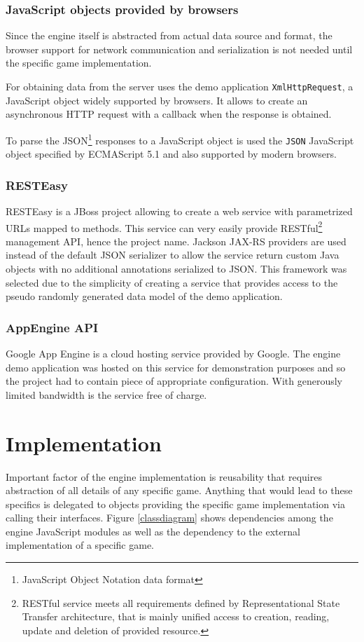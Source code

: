 \documentclass[11pt,oneside, final]{fithesis2}
\begin{document}
\subsection{JavaScript objects provided by browsers}
Since the engine itself is abstracted from actual data source and format, the browser support for network communication and serialization is not needed until the specific game implementation.

For obtaining data from the server uses the demo application \texttt{XmlHttpRequest}, a JavaScript object widely supported by browsers\cite{xhr}. It allows to create an asynchronous HTTP request with a callback when the response is obtained.

To parse the JSON\footnote{JavaScript Object Notation data format} responses to a JavaScript object is used the \texttt{JSON} JavaScript object specified by ECMAScript 5.1 and also supported by modern browsers\cite{json}.

\subsection{RESTEasy}
RESTEasy is a JBoss project allowing to create a web service with parametrized URLs mapped to methods\cite{resteasy}. This service can very easily  provide RESTful\footnote{RESTful service meets all requirements defined by Representational State Transfer architecture, that is mainly unified access to creation, reading, update and deletion of provided resource\cite{fielding}.} management API, hence the project name. Jackson JAX-RS providers\cite{jackson} are used instead of the default JSON serializer to allow the service return custom Java objects with no additional annotations serialized to JSON. This framework was selected due to the simplicity of creating a service that provides access to the pseudo randomly generated data model of the demo application.

\subsection{AppEngine API}
Google App Engine is a cloud hosting service provided by Google. The engine demo application was hosted on this service for demonstration purposes and so the project had to contain piece of appropriate configuration. With generously limited bandwidth is the service free of charge. \cite{appengine}

\chapter{Implementation}
\label{implementation}
Important factor of the engine implementation is reusability that requires abstraction of all details of any specific game. Anything that would lead to these specifics is delegated to objects providing the specific game implementation via calling their interfaces. Figure \ref{classdiagram} shows dependencies among the engine JavaScript modules as well as the dependency to the external implementation of a specific game.
\end{document}
